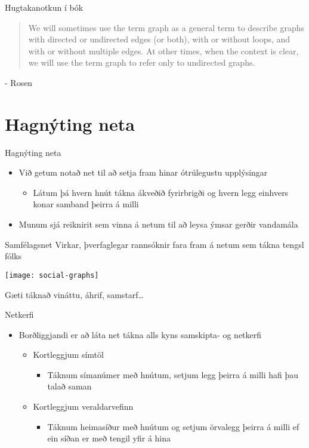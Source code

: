 \documentclass[handout]{beamer}
\begin{document}
\begin{frame}{Hugtakanotkun í bók}
\begin{quotation}
We will sometimes use the term graph as a general term to describe graphs with directed or undirected edges
(or both), with or without loops, and with or without multiple edges. At other times, when the
context is clear, we will use the term graph to refer only to undirected graphs.
\end{quotation} - Rosen

\end{frame}

\section{Hagnýting neta}

\begin{frame}{Hagnýting neta}
\begin{itemize}
 \item Við getum notað net til að setja fram hinar ótrúlegustu upplýsingar
 \begin{itemize}
  \item Látum þá hvern hnút tákna ákveðið fyrirbrigði og hvern legg einhvers konar samband þeirra á milli
 \end{itemize}
 \item Munum sjá reiknirit sem vinna á netum til að leysa ýmsar gerðir vandamála
\end{itemize}
\end{frame}

\begin{frame}{Samfélagsnet}
Virkar, þverfaglegar rannsóknir fara fram á netum sem tákna tengsl fólks
\begin{center}
\texttt{[image: social-graphs]}
\end{center}
Gæti táknað vináttu, áhrif, samstarf\ldots
\end{frame}

\begin{frame}{Netkerfi}
\begin{itemize}
 \item Borðliggjandi er að láta net tákna alls kyns samskipta- og netkerfi
 \begin{itemize}
  \item Kortleggjum símtöl
  \begin{itemize}
   \item Táknum símanúmer með hnútum, setjum legg þeirra á milli hafi þau talað saman
  \end{itemize}
  \item Kortleggjum veraldarvefinn
  \begin{itemize}
   \item Táknum heimasíður með hnútum og setjum örvalegg þeirra á milli ef ein síðan er með tengil yfir á hina
  \end{itemize}
 \end{itemize}
\end{itemize}
\end{frame}
\end{document}

